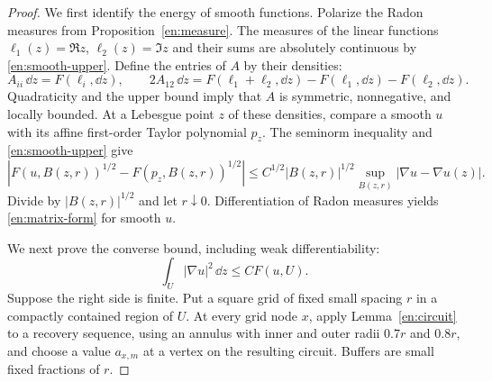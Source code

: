 \begin{proof}
We first identify the energy of smooth functions.  Polarize the Radon
measures from Proposition~\ref{en:measure}.  The measures of the linear
functions $\ell_1(z)=\Re z$, $\ell_2(z)=\Im z$ and their sums are
absolutely continuous by \eqref{en:smooth-upper}.  Define the entries of
$A$ by their densities:
\[
 A_{ii}\,\dd z=F(\ell_i,\dd z),\qquad
 2A_{12}\,\dd z=
 F(\ell_1+\ell_2,\dd z)-F(\ell_1,\dd z)-F(\ell_2,\dd z).
\]
Quadraticity and the upper bound imply that $A$ is symmetric,
nonnegative, and locally bounded.  At a Lebesgue point $z$ of these
densities, compare a smooth $u$ with its affine first-order Taylor
polynomial $p_z$.  The seminorm inequality and
\eqref{en:smooth-upper} give
\[
 \left|F(u,B(z,r))^{1/2}-F(p_z,B(z,r))^{1/2}\right|
 \le C^{1/2}|B(z,r)|^{1/2}
          \sup_{B(z,r)}|\nabla u-\nabla u(z)|.
\]
Divide by $|B(z,r)|^{1/2}$ and let $r\downarrow0$.  Differentiation of
Radon measures yields \eqref{en:matrix-form} for smooth $u$.

We next prove the converse bound, including weak differentiability:
\begin{equation}\label{en:coercivity}
                 \int_U|\nabla u|^2\,\dd z\le C F(u,U).
\end{equation}
Suppose the right side is finite.  Put a square grid of fixed small
spacing $r$ in a compactly contained region of $U$.  At every grid node
$x$, apply Lemma~\ref{en:circuit} to a recovery sequence, using an
annulus with inner and outer radii $0.7r$ and $0.8r$, and choose a value
$a_{x,m}$ at a vertex on the resulting circuit.  Buffers are small fixed
fractions of $r$.


\end{proof}
